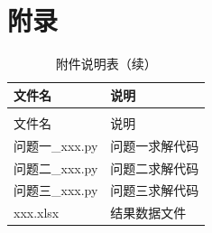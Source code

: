 
\makeatletter
\let\@oldaddcontentsline\addcontentsline
\renewcommand{\addcontentsline}[3]{}
\section*{附录}
\let\addcontentsline\@oldaddcontentsline
\makeatother


\begin{longtable}{>{\raggedright\arraybackslash}p{}>{\raggedright\arraybackslash}p{}}
  \caption{附件说明表}
  \label{tab:appendix} \\
  \toprule
  文件名 & 说明 \\
  \midrule
  \endfirsthead
  \caption{附件说明表（续）} \\
  \toprule
  文件名 & 说明 \\
  \midrule
  \endhead
  \bottomrule
  \endfoot
  问题一\_xxx.py & 问题一求解代码 \\
  问题二\_xxx.py & 问题二求解代码 \\
  问题三\_xxx.py & 问题三求解代码 \\
  xxx.xlsx & 结果数据文件 \\
\end{longtable}
